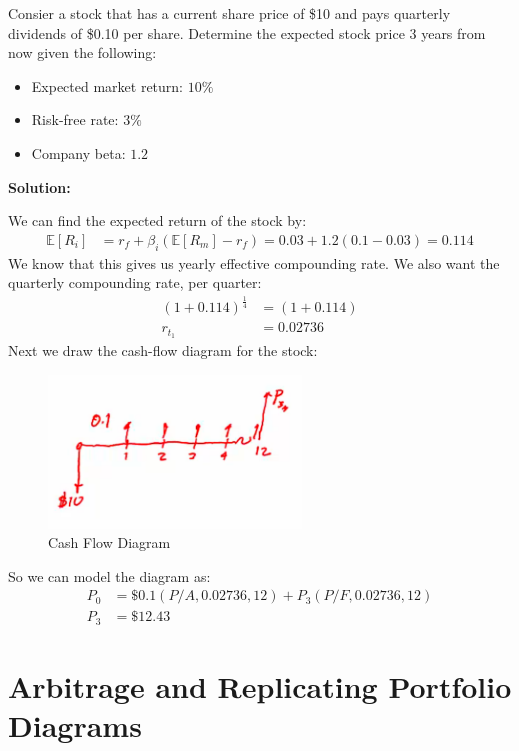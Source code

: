 \begin{example}
    Consier a stock that has a current share price of \$10 and pays quarterly dividends of \$0.10 per share. Determine the expected stock price 3 years from now given the following:
    \begin{itemize}
        \item Expected market return: $10\%$
        \item Risk-free rate: $3\%$
        \item Company beta: $1.2$
    \end{itemize}

    \textbf{Solution:}

    We can find the expected return of the stock by:
    \begin{align*}
        \mathbb{E}[R_i] & = r_f + \beta_i(\mathbb{E}[R_m] - r_f) = 0.03 + 1.2(0.1 - 0.03) = 0.114
    \end{align*}
    We know that this gives us yearly effective compounding rate. We also want the quarterly compounding rate, per quarter:
    \begin{align*}
        (1 + 0.114)^{\frac{1}{4}} & = (1 + 0.114) \\
        r_{t_1}                   & = 0.02736
    \end{align*}
    Next we draw the cash-flow diagram for the stock:
    \begin{figure}[h!]
        \centering
        \includegraphics[width=0.6\textwidth]{LECTURE_4/cash-flow.png}
        \caption{Cash Flow Diagram}
        \label{fig:cash_flow_diagram}
    \end{figure}
    So we can model the diagram as:
    \begin{align*}
        P_0   & = \$0.1(P/A, 0.02736, 12) + P_3(P/F, 0.02736, 12) \\
        P_{3} & = \$ 12.43
    \end{align*}
\end{example}

\section{Arbitrage and Replicating Portfolio Diagrams}

